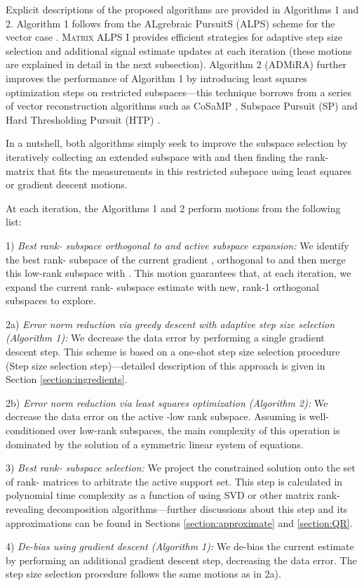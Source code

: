 \documentclass[twocolumn]{svjour3}
\begin{document}
Explicit descriptions of the proposed algorithms are provided in Algorithms 1 and 2. Algorithm 1 follows from the ALgrebraic PursuitS (ALPS) scheme for the vector case \cite{cevher2011alps}. \textsc{Matrix ALPS I} provides efficient strategies for adaptive step size selection and additional signal estimate updates at each iteration (these motions are explained in detail in the next subsection). Algorithm 2 (ADMiRA) \cite{admira2010} further improves the performance of Algorithm 1 by introducing least squares optimization steps on restricted subspaces---this technique borrows from a series of vector reconstruction algorithms such as CoSaMP \cite{cosamp}, Subspace Pursuit (SP) \cite{SP} and Hard Thresholding Pursuit (HTP) \cite{HTP}. 

In a nutshell, both algorithms simply seek to improve the subspace selection by iteratively collecting an extended subspace  with  and then finding the rank- matrix that fits the measurements in this restricted subspace using least squares or gradient descent motions. 

At each iteration, the Algorithms 1 and 2 perform motions from the following list:

\begin{framed}
1) \textit{Best rank- subspace orthogonal to  and active subspace expansion:} We identify the best rank- subspace of the current gradient , orthogonal to  and then merge this low-rank subspace with . This motion guarantees that, at each iteration, we expand the current rank- subspace estimate with  new, rank-1 orthogonal subspaces to explore. 

2a) \textit{Error norm reduction via greedy descent with adaptive step size selection (Algorithm 1):} We decrease the data error by performing a single gradient descent step. This scheme is based on a one-shot step size selection procedure (Step size selection step)---detailed description of this approach is given in Section \ref{section:ingredients}.

2b) \textit{Error norm reduction via least squares optimization (Algorithm 2):} We decrease the data error  on the active -low rank subspace. Assuming  is well-conditioned over low-rank subspaces, the main complexity of this operation is dominated by the solution of a symmetric linear system of equations. 

3) \textit{Best rank- subspace selection:} We project the constrained solution onto the set of rank- matrices  to arbitrate the active support set. 
This step is calculated in polynomial time complexity as a function of  using SVD or other matrix rank-revealing decomposition algorithms---further discussions about this step and its approximations can be found in Sections \ref{section:approximate} and \ref{section:QR}.

4) \textit{De-bias using gradient descent (Algorithm 1):} We de-bias the current estimate  by performing an additional gradient descent step, decreasing the data error. The step size selection procedure follows the same motions as in 2a).

\end{framed}
\end{document}
